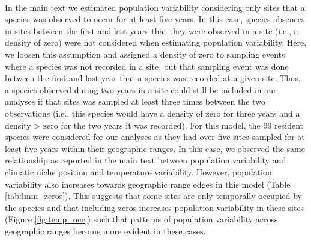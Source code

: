 \paragraph*{}
In the main text we estimated population variability considering only sites that a species was observed to occur for at least five years. In this case, species absences in sites between the first and last years that they were observed in a site (i.e., a density of zero) were not considered when estimating population variability. Here, we loosen this assumption and assigned a density of zero to sampling events where a species was not recorded in a site, but that sampling event was done between the first and last year that a species was recorded at a given site. Thus, a species observed during two years in a site could still be included in our analyses if that sites was sampled at least three times between the two observations (i.e., this species would have a density of zero for three years and a density > zero for the two years it was recorded). For this model, the 99 resident species were considered for our analyses as they had over five sites sampled for at least five years within their geographic ranges. In this case, we observed the same relationship as reported in the main text between population variability and climatic niche position and temperature variability. However, population variability also increases towards geographic range edges in this model (Table \ref{tab:lmm_zeros}).  This suggests that some sites are only temporally occupied by the species and that including zeros increases population variability in these sites (Figure \ref{fig:temp_occ}) such that patterns of population variability across geographic ranges become more evident in these cases.

